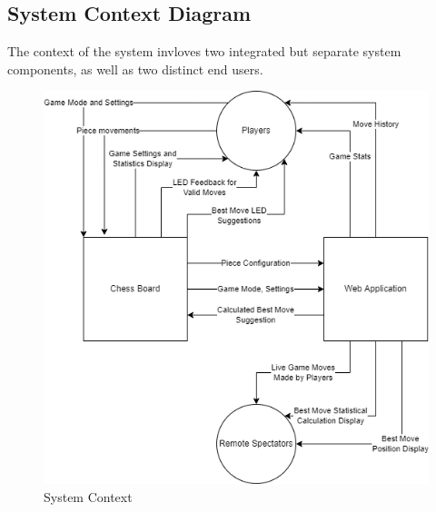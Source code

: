 \documentclass[12pt]{article}
\begin{document}
\subsection{System Context Diagram}{

    The context of the system invloves two integrated but separate system components, as well as two distinct end users.

    \begin{figure}[H]
    \centering
        \includegraphics[scale=0.65]{chess-connect-system-context.png}
        \caption{System Context}
        \label{Fig_SystemContext} 
    \end{figure}
}
\end{document}
